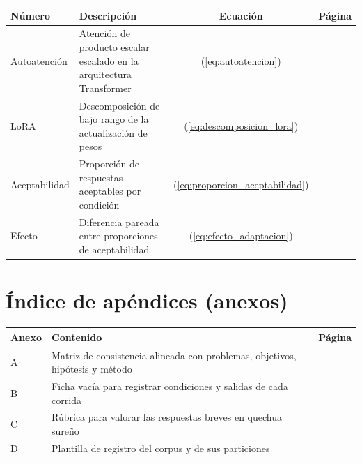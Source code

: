 \begin{table}[H]
\centering
\small
\begin{tabularx}{\textwidth}{@{}P{2.2cm}Lcc@{}}
\toprule
{}
\textbf{Número} & \textbf{Descripción} & \textbf{Ecuación} & \textbf{Página} \\
\midrule
Autoatención & Atención de producto escalar escalado en la arquitectura Transformer & (\ref{eq:autoatencion}) & \pageref{eq:autoatencion} \\
LoRA & Descomposición de bajo rango de la actualización de pesos & (\ref{eq:descomposicion_lora}) & \pageref{eq:descomposicion_lora} \\
Aceptabilidad & Proporción de respuestas aceptables por condición & (\ref{eq:proporcion_aceptabilidad}) & \pageref{eq:proporcion_aceptabilidad} \\
Efecto & Diferencia pareada entre proporciones de aceptabilidad & (\ref{eq:efecto_adaptacion}) & \pageref{eq:efecto_adaptacion} \\
\bottomrule
\end{tabularx}
\end{table}

\clearpage
{}
{}
\chapter*{Índice de apéndices (anexos)}

\begin{table}[H]
\centering
\small
\begin{tabularx}{\textwidth}{@{}P{2.0cm}Lc@{}}
\toprule
{}
\textbf{Anexo} & \textbf{Contenido} & \textbf{Página} \\
\midrule
A & Matriz de consistencia alineada con problemas, objetivos, hipótesis y método & \pageref{anexo:matriz_consistencia} \\
B & Ficha vacía para registrar condiciones y salidas de cada corrida & \pageref{anexo:ficha_tecnica} \\
C & Rúbrica para valorar las respuestas breves en quechua sureño & \pageref{anexo:revision_linguistica} \\
D & Plantilla de registro del corpus y de sus particiones & \pageref{anexo:banco_consultas} \\
\bottomrule
\end{tabularx}
\end{table}

\clearpage
{}
{}
